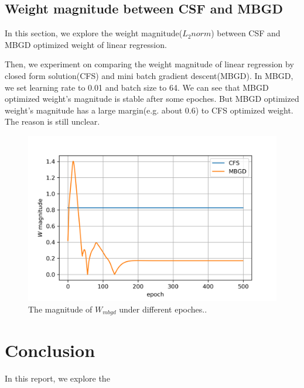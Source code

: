 \documentclass[journal, a4paper]{IEEEtran}
\begin{document}
\subsection{Weight magnitude between CSF and MBGD}
In this section, we explore the weight magnitude($L_2norm$) between CSF and MBGD optimized weight of linear regression. \par

Then, we experiment on comparing the weight magnitude of linear regression by closed form solution(CFS) and mini batch gradient descent(MBGD). In MBGD, we set learning rate to 0.01 and batch size to 64. We can see that MBGD optimized weight's magnitude is stable after some epoches. But MBGD optimized weight's magnitude has a large margin(e.g. about 0.6) to CFS optimized weight. The reason is still unclear. 


\begin{figure}[!hbt]
	\begin{center}
		\includegraphics[width=\columnwidth]{mbgd_w}
		\caption{The magnitude of $W_{mbgd}$ under different epoches..}
		\label{fig:mbgd_w}
	\end{center}
\end{figure} 

\section{Conclusion}
In this report, we explore the 



\end{document}
